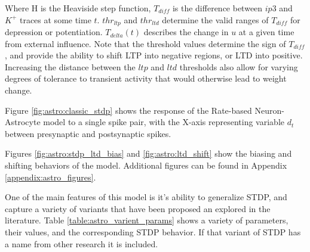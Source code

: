     Where H is the Heaviside step function, $T_{diff}$ is the difference between
    $ip3$ and $K^+$ traces at some time $t$. $thr_{ltp}$ and $thr_{ltd}$ determine the valid
    ranges of $T_{diff}$ for depression or potentiation. $T_{delta}(t)$ describes
    the change in $u$ at a given time from external influence. Note that the
    threshold values determine the sign of $T_{diff}$, and provide the ability
    to shift LTP into negative regions, or LTD into positive. Increasing the
    distance between the $ltp$ and $ltd$ thresholds also allow for varying
    degrees of tolerance to transient activity that would otherwise lead to
    weight change.

    Figure \ref{fig:astro:classic_stdp} shows the response of the Rate-based
    Neuron-Astrocyte model to a single spike pair, with the X-axis representing
    variable $d_t$ between presynaptic and postsynaptic spikes.


    Figures \ref{fig:astro:stdp_ltd_bias} and \ref{fig:astro:ltd_shift} show the
    biasing and shifting behaviors of the model. Additional figures can be found
    in Appendix \ref{appendix:astro_figures}.
    


    One of the main features of this model is it's ability to generalize STDP,
    and capture a variety of variants that have been proposed an explored in the
    literature. Table \ref{table:astro_varient_params} shows a variety of
    parameters, their values, and the corresponding STDP behavior. If that
    variant of STDP has a name from other research it is included.


